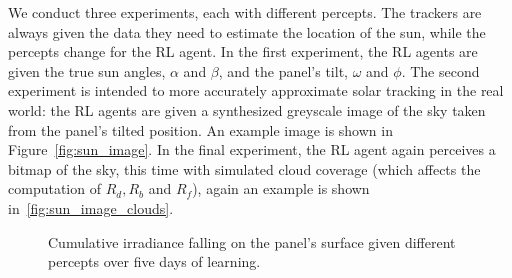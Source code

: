 \documentclass[11pt]{article}
\begin{document}
We conduct three experiments, each with different percepts. The trackers are always given the data they need to estimate the location of the sun, while the percepts change for the RL agent. In the first experiment, the RL agents are given the true sun angles, $\alpha$ and $\beta$, and the panel's tilt, $\omega$ and $\phi$. The second experiment is intended to more accurately approximate solar tracking in the real world: the RL agents are given a synthesized greyscale image of the sky taken from the panel's tilted position. An example image is shown in Figure~\ref{fig:sun_image}. In the final experiment, the RL agent again perceives a bitmap of the sky, this time with simulated cloud coverage (which affects the computation of $R_d, R_b$ and $R_f$), again an example is shown in~\ref{fig:sun_image_clouds}.



\begin{figure}[h]
\begin{center}
	 \hspace{4mm} %
	 \hspace{4mm} %
	 \hspace{4mm} %
\caption{Cumulative irradiance falling on the panel's surface given different percepts over five days of learning.}
\end{center}
\end{figure}















\scriptsize{}
\end{document}
